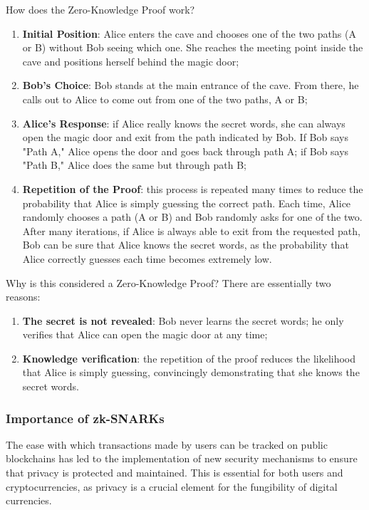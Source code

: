 \noindent How does the Zero-Knowledge Proof work?
\begin{enumerate}
    \item \textbf{Initial Position}: Alice enters the cave and chooses one of the two paths (A or B) without Bob seeing which one. She reaches the meeting point inside the cave and positions herself behind the magic door;
    \item \textbf{Bob's Choice}: Bob stands at the main entrance of the cave. From there, he calls out to Alice to come out from one of the two paths, A or B;
    \item \textbf{Alice's Response}: if Alice really knows the secret words, she can always open the magic door and exit from the path indicated by Bob. If Bob says "Path A," Alice opens the door and goes back through path A; if Bob says "Path B," Alice does the same but through path B;
    \item \textbf{Repetition of the Proof}: this process is repeated many times to reduce the probability that Alice is simply guessing the correct path. Each time, Alice randomly chooses a path (A or B) and Bob randomly asks for one of the two. After many iterations, if Alice is always able to exit from the requested path, Bob can be sure that Alice knows the secret words, as the probability that Alice correctly guesses each time becomes extremely low.
\end{enumerate}

\noindent Why is this considered a Zero-Knowledge Proof? There are essentially two reasons:
\begin{enumerate}
    \item \textbf{The secret is not revealed}: Bob never learns the secret words; he only verifies that Alice can open the magic door at any time;
    \item \textbf{Knowledge verification}: the repetition of the proof reduces the likelihood that Alice is simply guessing, convincingly demonstrating that she knows the secret words.
\end{enumerate}

\subsubsection{Importance of zk-SNARKs}

The ease with which transactions made by users can be tracked on public blockchains has led to the implementation of new security mechanisms to ensure that privacy is protected and maintained. This is essential for both users and cryptocurrencies, as privacy is a crucial element for the fungibility of digital currencies.

